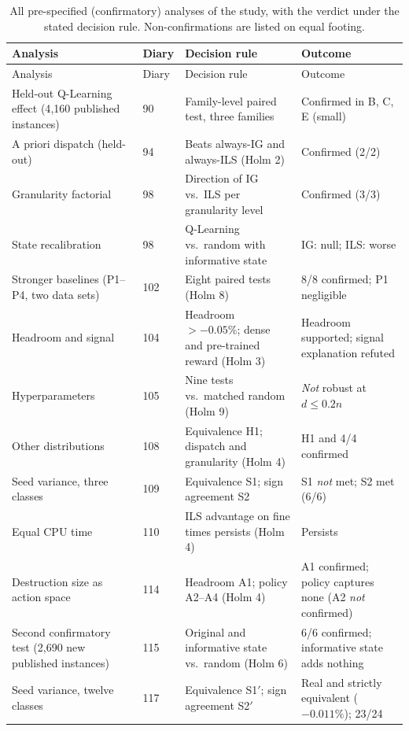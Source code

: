 \begin{longtable}{@{}p{}p{}p{}p{}@{}}
\caption{All pre-specified (confirmatory) analyses of the study, with the verdict under the stated decision rule. Non-confirmations are listed on equal footing.}\label{tab:s_prereg_all}\\
\toprule
Analysis & Diary & Decision rule & Outcome \\
\midrule
\endfirsthead
\toprule
Analysis & Diary & Decision rule & Outcome \\
\midrule
\endhead
Held-out Q-Learning effect (4{,}160 published instances) & 90 & Family-level paired test, three families & Confirmed in B, C, E (small) \\
A priori dispatch (held-out) & 94 & Beats always-IG and always-ILS (Holm 2) & Confirmed (2/2) \\
Granularity factorial & 98 & Direction of IG vs.\ ILS per granularity level & Confirmed (3/3) \\
State recalibration & 98 & Q-Learning vs.\ random with informative state & IG: null; ILS: worse \\
Stronger baselines (P1--P4, two data sets) & 102 & Eight paired tests (Holm 8) & 8/8 confirmed; P1 negligible \\
Headroom and signal & 104 & Headroom $>-0.05\%$; dense and pre-trained reward (Holm 3) & Headroom supported; signal explanation refuted \\
Hyperparameters & 105 & Nine tests vs.\ matched random (Holm 9) & \emph{Not} robust at $d\leq0.2n$ \\
Other distributions & 108 & Equivalence H1; dispatch and granularity (Holm 4) & H1 and 4/4 confirmed \\
Seed variance, three classes & 109 & Equivalence S1; sign agreement S2 & S1 \emph{not} met; S2 met (6/6) \\
Equal CPU time & 110 & ILS advantage on fine times persists (Holm 4) & Persists \\
Destruction size as action space & 114 & Headroom A1; policy A2--A4 (Holm 4) & A1 confirmed; policy captures none (A2 \emph{not} confirmed) \\
Second confirmatory test (2{,}690 new published instances) & 115 & Original and informative state vs.\ random (Holm 6) & 6/6 confirmed; informative state adds nothing \\
Seed variance, twelve classes & 117 & Equivalence S1$'$; sign agreement S2$'$ & Real and strictly equivalent ($-0.011\%$); 23/24 \\

\end{longtable}
